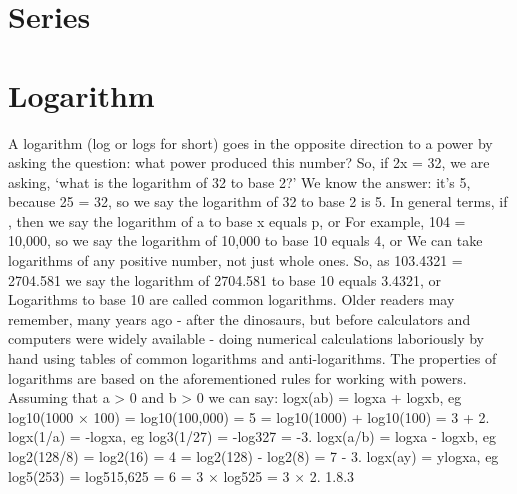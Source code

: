 
\section{Series}


\section{Logarithm}
A logarithm (log or logs for short) goes in the opposite direction to a power by asking the question: what power produced this number? So, if 2x = 32, we are asking, ‘what is the logarithm of 32 to base 2?’ We know the answer: it's 5, because 25 = 32, so we say the logarithm of 32 to base 2 is 5. In general terms, if , then we say the logarithm of a to base x equals p, or For example, 104 = 10,000, so we say the logarithm of 10,000 to base 10 equals 4, or We can take logarithms of any positive number, not just whole ones. So, as 103.4321 = 2704.581 we say the logarithm of 2704.581 to base 10 equals 3.4321, or Logarithms to base 10 are called common logarithms. Older readers may remember, many years ago - after the dinosaurs, but before calculators and computers were widely available - doing numerical calculations laboriously by hand using tables of common logarithms and anti-logarithms. The properties of logarithms are based on the aforementioned rules for working with powers. Assuming that a > 0 and b > 0 we can say: logx(ab) = logxa + logxb, eg log10(1000 × 100) = log10(100,000) = 5 = log10(1000) + log10(100) = 3 + 2. logx(1/a) = -logxa, eg log3(1/27) = -log327 = -3. logx(a/b) = logxa - logxb, eg log2(128/8) = log2(16) = 4 = log2(128) - log2(8) = 7 - 3. logx(ay) = ylogxa, eg log5(253) = log515,625 = 6 = 3 × log525 = 3 × 2. 1.8.3


